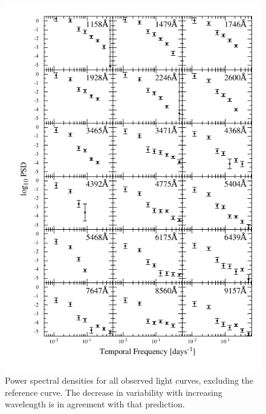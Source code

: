 \documentclass[11pt,letterpaper]{article}
\begin{document}
    \begin{figure}
        \centering
        \includegraphics[width=.9\textwidth]{../img/psd_atlas.pdf}
        \caption{Power spectral densities for all observed light curves, excluding the reference curve. The decrease in variability with increasing wavelength is in agreement with that prediction.}
        \label{psd_atlas}
    \end{figure}
\end{document}
